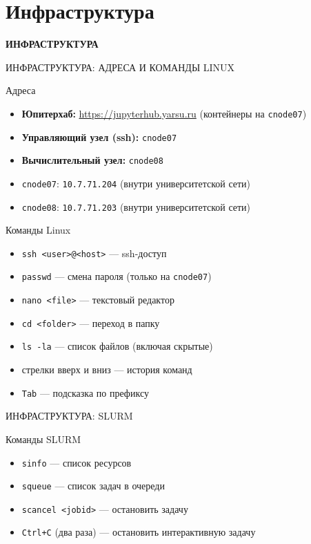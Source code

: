 \documentclass[aspectratio=169]{beamer}
\begin{document}
	\section{Инфраструктура}	
	{

		\begin{frame}
			\centering
			\vspace{2cm}
			{\huge\headerfont\bfseries ИНФРАСТРУКТУРА}
		\end{frame}

	\begin{frame}{ИНФРАСТРУКТУРА: АДРЕСА И КОМАНДЫ LINUX}
		
		{Адреса}
		\begin{itemize}
			\item [-] \textbf{Юпитерхаб:} \url{https://jupyterhub.yarsu.ru} (контейнеры на \texttt{cnode07})
			\item [-] \textbf{Управляющий узел (ssh):} \texttt{cnode07}
			\item [-] \textbf{Вычислительный узел:} \texttt{cnode08}
			\item [-] \texttt{cnode07}: \texttt{10.7.71.204} (внутри университетской сети)
			\item [-] \texttt{cnode08}: \texttt{10.7.71.203} (внутри университетской сети)
		\end{itemize}

		\bigskip
		{Команды Linux}
		\begin{itemize}
			\item [-] \texttt{ssh <user>@<host>} — ssh-доступ
			\item [-] \texttt{passwd} — смена пароля (только на \texttt{cnode07})
			\item [-] \texttt{nano <file>} — текстовый редактор
			\item [-] \texttt{cd <folder>} — переход в папку
			\item [-] \texttt{ls -la} — список файлов (включая скрытые)
			\item [-] стрелки вверх и вниз — история команд
			\item [-] \texttt{Tab} — подсказка по префиксу
		\end{itemize}
	\end{frame}

	\begin{frame}{ИНФРАСТРУКТУРА: SLURM}
		
		{Команды SLURM}
		\begin{itemize}
			\item [-] \texttt{sinfo} — список ресурсов
			\item [-] \texttt{squeue} — список задач в очереди
			\item [-] \texttt{scancel <jobid>} — остановить задачу
			\item [-] \texttt{Ctrl+C} (два раза) — остановить интерактивную задачу
		\end{itemize}


\end{frame}}
\end{document}
